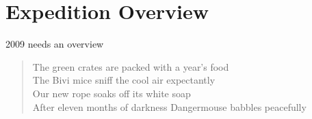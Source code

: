 \section{Expedition Overview}

2009 needs an overview


\begin{verse}
\begin{centering}
The green crates are packed with a year's food\\
The Bivi mice sniff the cool air expectantly\\
Our new rope soaks off its white soap\\
After eleven months of darkness Dangermouse babbles peacefully
 \end{centering} 
\end{verse}